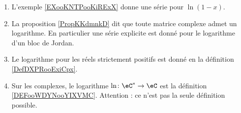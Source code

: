\begin{enumerate}
    \item
        L'exemple \ref{EXooKNTPooKiRExX} donne une série pour \( \ln(1-x)\).
    \item
        La proposition \ref{PropKKdmnkD} dit que toute matrice complexe admet un logarithme. En particulier une série explicite est donné pour le logarithme d'un bloc de Jordan.
    \item
        Le logarithme pour les réels strictement positifs est donné en la définition \ref{DefDXPRooExiCpx}.
    \item
        Sur les complexes, le logarithme \( \ln \colon \eC^*\to \eC\) est la définition \ref{DEFooWDYNooYIXVMC}. Attention : ce n'est pas la seule définition possible.
\end{enumerate}
